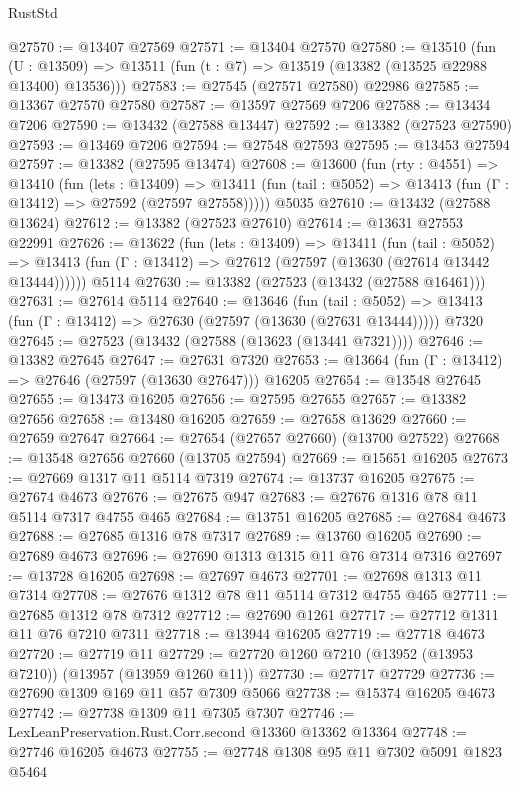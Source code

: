 \begin{lexlean}{RustStd}
\begin{coremodule}
@27570 := @13407 @27569
@27571 := @13404 @27570
@27580 := @13510
    (fun (U : @13509) => @13511 (fun (t : @7) => @13519 (@13382 (@13525 @22988 @13400) @13536)))
@27583 := @27545 (@27571 @27580) @22986
@27585 := @13367 @27570 @27580
@27587 := @13597 @27569 @7206
@27588 := @13434 @7206
@27590 := @13432 (@27588 @13447)
@27592 := @13382 (@27523 @27590)
@27593 := @13469 @7206
@27594 := @27548 @27593
@27595 := @13453 @27594
@27597 := @13382 (@27595 @13474)
@27608 := @13600
    (fun (rty : @4551) =>
    @13410
      (fun (lets : @13409) =>
      @13411 (fun (tail : @5052) => @13413 (fun (Γ : @13412) => @27592 (@27597 @27558)))))
    @5035
@27610 := @13432 (@27588 @13624)
@27612 := @13382 (@27523 @27610)
@27614 := @13631 @27553 @22991
@27626 := @13622
    (fun (lets : @13409) =>
    @13411
      (fun (tail : @5052) =>
      @13413 (fun (Γ : @13412) => @27612 (@27597 (@13630 (@27614 @13442 @13444))))))
    @5114
@27630 := @13382 (@27523 (@13432 (@27588 @16461)))
@27631 := @27614 @5114
@27640 := @13646
    (fun (tail : @5052) => @13413 (fun (Γ : @13412) => @27630 (@27597 (@13630 (@27631 @13444)))))
    @7320
@27645 := @27523 (@13432 (@27588 (@13623 (@13441 @7321))))
@27646 := @13382 @27645
@27647 := @27631 @7320
@27653 := @13664 (fun (Γ : @13412) => @27646 (@27597 (@13630 @27647))) @16205
@27654 := @13548 @27645
@27655 := @13473 @16205
@27656 := @27595 @27655
@27657 := @13382 @27656
@27658 := @13480 @16205
@27659 := @27658 @13629
@27660 := @27659 @27647
@27664 := @27654 (@27657 @27660) (@13700 @27522)
@27668 := @13548 @27656 @27660 (@13705 @27594)
@27669 := @15651 @16205
@27673 := @27669 @1317 @11 @5114 @7319
@27674 := @13737 @16205
@27675 := @27674 @4673
@27676 := @27675 @947
@27683 := @27676 @1316 @78 @11 @5114 @7317 @4755 @465
@27684 := @13751 @16205
@27685 := @27684 @4673
@27688 := @27685 @1316 @78 @7317
@27689 := @13760 @16205
@27690 := @27689 @4673
@27696 := @27690 @1313 @1315 @11 @76 @7314 @7316
@27697 := @13728 @16205
@27698 := @27697 @4673
@27701 := @27698 @1313 @11 @7314
@27708 := @27676 @1312 @78 @11 @5114 @7312 @4755 @465
@27711 := @27685 @1312 @78 @7312
@27712 := @27690 @1261
@27717 := @27712 @1311 @11 @76 @7210 @7311
@27718 := @13944 @16205
@27719 := @27718 @4673
@27720 := @27719 @11
@27729 := @27720 @1260 @7210 (@13952 (@13953 @7210)) (@13957 (@13959 @1260 @11))
@27730 := @27717 @27729
@27736 := @27690 @1309 @169 @11 @57 @7309 @5066
@27738 := @15374 @16205 @4673
@27742 := @27738 @1309 @11 @7305 @7307
@27746 := LexLeanPreservation.Rust.Corr.second @13360 @13362 @13364
@27748 := @27746 @16205 @4673
@27755 := @27748 @1308 @95 @11 @7302 @5091 @1823 @5464

\end{coremodule}
\end{lexlean}
